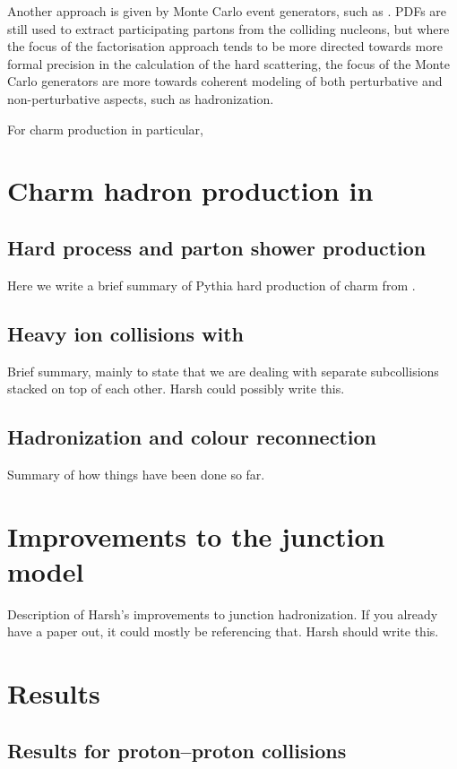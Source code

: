 \documentclass[main.tex]{subfiles}
\begin{document}
Another approach is given by Monte Carlo event generators, such as \pythia \cite{Bierlich:2022pfr}. PDFs are still used to extract participating partons from the colliding nucleons, but where the focus of the factorisation approach tends to be more directed towards more formal precision in the calculation of the hard scattering, the focus of the Monte Carlo generators are more towards coherent modeling of both perturbative and non-perturbative aspects, such as hadronization.

For charm production in particular, 


\section{Charm hadron production in \pythia}

\subsection{Hard process and parton shower production}
Here we write a brief summary of Pythia hard production of charm from \cite{Norrbin:1998bw}.

\subsection{Heavy ion collisions with \angantyr}
Brief summary, mainly to state that we are dealing with separate subcollisions stacked on top of each other. Harsh could possibly write this.

\subsection{Hadronization and colour reconnection}
Summary of how things have been done so far.

\section{Improvements to the junction model}
Description of Harsh's improvements to junction hadronization. If you already have a paper out, it could mostly be referencing that. Harsh should write this.

\section{Results}

\subsection{Results for proton--proton collisions}
\end{document}

